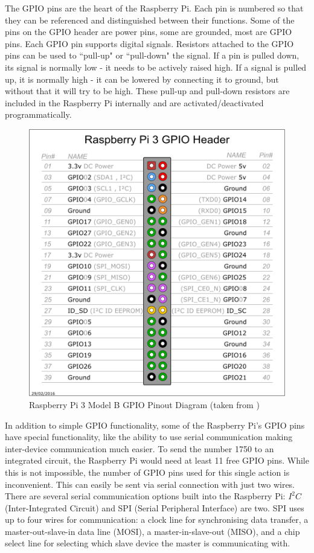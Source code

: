 \documentclass[twoside,a4]{report}
\def\br{\newline \newline \noindent}
\begin{document}
	\br
	The GPIO pins are the heart of the Raspberry Pi. Each pin is numbered so that they can be referenced and distinguished between their functions. Some of the pins on the GPIO header are power pins, some are grounded, most are GPIO pins. Each GPIO pin supports digital signals. Resistors attached to the GPIO pins can be used to ``pull-up" or ``pull-down" the signal. If a pin is pulled down, its signal is normally low - it needs to be actively raised high. If a signal is pulled up, it is normally high - it can be lowered by connecting it to ground, but without that it will try to be high. These pull-up and pull-down resistors are included in the Raspberry Pi internally and are activated/deactivated programmatically.
	
	\begin{figure}[!htb]
		\centering
		\includegraphics[scale=0.2]{images/gpiopinout.png}
		\caption{Raspberry Pi 3 Model B GPIO Pinout Diagram (taken from  \cite{pigpiopinout})}
		\label{gpiopinout}
	\end{figure}
	
	\noindent
	In addition to simple GPIO functionality, some of the Raspberry Pi's GPIO pins have special functionality, like the ability to use serial communication making inter-device communication much easier. To send the number 1750 to an integrated circuit, the Raspberry Pi would need at least 11 free GPIO pins. While this is not impossible, the number of GPIO pins used for this single action is inconvenient. This can easily be sent via serial connection with just two wires. There are several serial communication options built into the Raspberry Pi: $I^2C$ (Inter-Integrated Circuit) and SPI (Serial Peripheral Interface) are two. SPI uses up to four wires for communication: a clock line for synchronising data transfer, a master-out-slave-in data line (MOSI), a master-in-slave-out (MISO), %
	and a chip select line for selecting which slave device the master is communicating with.
	
\end{document}
